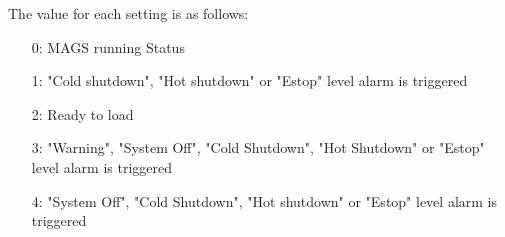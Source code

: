 The value for each setting is as follows:
\begin{itemize}
    \item[0:]  MAGS running Status
    \item[1:] "Cold shutdown", "Hot shutdown" or "Estop" level alarm is triggered
    \item[2:] Ready to load
    \item[3:] "Warning", "System Off", "Cold Shutdown", "Hot Shutdown" or "Estop" level alarm is triggered
    \item[4:] "System Off", "Cold Shutdown", "Hot shutdown" or "Estop" level alarm is triggered
\end{itemize}

